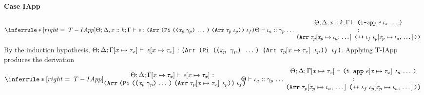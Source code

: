 \begin{sproof}
  \paragraph{Case {\sc IApp}}
  \[{\infr[T-IApp]
    {\typeof
      {\sEnv}{\kEnv, \haskind{\var}{\kind}}{\tEnv}
      {\expr}
      {\typearray{\typedprod{\sequence{\notevar{\var_p}{\sort_p}}}{\typearray{\type_p}{\idx_p}}}{\idx_f}}
      \\\\
      \sequence{\sortof{\sEnv}{\idx_a}{\sort_p}}}
    {\parbox{0.6\textwidth}
      {\centering
        \({\sEnv};{\kEnv, \haskind{\var}{\kind}};{\tEnv}\vdash\)
        \({\iapp{\expr}{\sequence{\idx_a}}}\)\\
        \(:{\typearray{\seqsubst{\type_p}{\var_p}{\idx_a}}{\idxappend{\idx_f\;\seqsubst{\idx_p}{\var_p}{\idx_a}}}}\)}}}\]
  By the induction hypothesis,
  ${\Theta};{\Delta};{\Gamma\hspace{-2pt}\left[ \mathit{x} \mapsto \mathit{\tau}_{\mathit{x}} \right]}\vdash$
  ${\mathit{e}\hspace{-2pt}\left[ \mathit{x} \mapsto \mathit{\tau}_{\mathit{x}} \right]}$ :
  {\tt (Arr (Pi (($\mathit{x}_p$ $\mathit{\gamma}_p$) $\, \ldots \,$) (Arr $\mathit{\tau}_p\hspace{-2pt}\left[ \mathit{x} \mapsto \mathit{\tau}_{\mathit{x}} \right]$ $\mathit{\iota}_p$)) $\mathit{\iota}_f$)}.
  Applying {\sc T-IApp} produces the derivation
  \[{\infr[T-IApp]
    {\parbox{0.6\textwidth}
      {\centering
        \({\sEnv};{\kEnv};{\typesubst{\tEnv}}\vdash\)
        \({\typesubst{\expr}}\)
        \(:{\typearray
          {\typedprod
            {\sequence{\notevar{\var_p}{\sort_p}}}
            {\typearray{\typesubst{\type_p}}{\idx_p}}}
          {\idx_f}}\)}
      \\\\\\
      \sequence{\sortof{\sEnv}{\idx_a}{\sort_p}}}
    {\parbox{0.6\textwidth}
      {\centering
        \({\sEnv};{\kEnv};{\typesubst{\tEnv}}\vdash\)
        \({\iapp{\typesubst{\expr}}{\sequence{\idx_a}}}\)\\
        \(:{\typearray{\seqsubst{\type_p}{\var_p}{\idx_a}}{\idxappend{\idx_f\;\seqsubst{\idx_p}{\var_p}{\idx_a}}}}\)}}}\]

\end{sproof}
